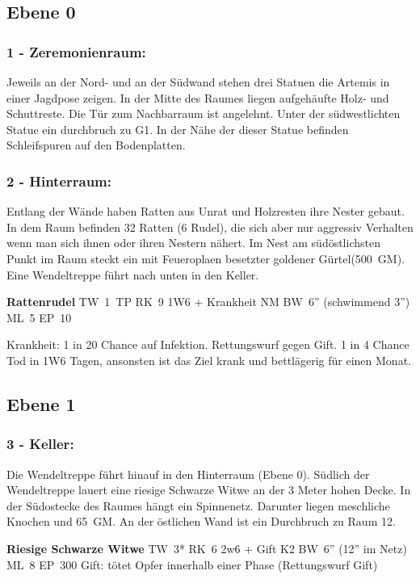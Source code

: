 \subsection{Ebene 0}

\subsubsection{1 - Zeremonienraum:} Jeweils an der Nord- und an der Südwand stehen drei
Statuen die Artemis in einer Jagdpose zeigen. In der Mitte des Raumes
liegen aufgehäufte Holz- und Schuttreste. Die Tür zum Nachbarraum ist
angelehnt. Unter der südwestlichten Statue ein durchbruch zu G1. In
der Nähe der dieser Statue befinden Schleifspuren auf den Bodenplatten.

\subsubsection{2 - Hinterraum:} Entlang der Wände haben Ratten aus Unrat und Holzresten
ihre Nester gebaut. In dem Raum befinden 32 Ratten (6 Rudel), die sich
aber nur aggressiv Verhalten wenn man sich ihnen oder ihren Nestern
nähert. Im Nest am südöstlichsten Punkt im Raum steckt ein mit
Feueroplaen besetzter goldener Gürtel(500~GM). Eine Wendeltreppe führt
nach unten in den Keller.  

\textbf{Rattenrudel} TW~1~TP RK~9 1W6 + Krankheit NM
BW~6'' (schwimmend 3'') ML~5 EP~10 

Krankheit: 1 in 20 Chance auf Infektion. Rettungswurf
gegen Gift. 1 in 4 Chance Tod in 1W6 Tagen, ansonsten ist das Ziel krank
und bettlägerig für einen Monat.

\subsection{Ebene 1}

\subsubsection{3 - Keller:} Die Wendeltreppe führt hinauf in den Hinterraum (Ebene
0). Südlich der Wendeltreppe lauert eine riesige Schwarze Witwe an
der 3 Meter hohen Decke.  In der Südostecke des Raumes hängt ein
Spinnenetz. Darunter liegen meschliche Knochen und 65~GM. An der östlichen
Wand ist ein Durchbruch zu Raum 12.  

\textbf{Riesige Schwarze Witwe} TW~3* RK~6 2w6 + Gift K2 BW~6'' (12''
im Netz) ML~8 EP~300 
Gift: tötet Opfer innerhalb einer Phase (Rettungswurf Gift)

